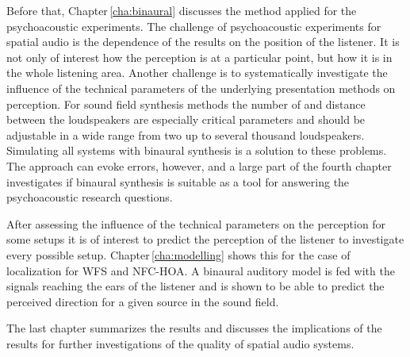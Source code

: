 Before that, Chapter\,\ref{cha:binaural} discusses the method applied for the
psychoacoustic experiments.
The challenge of psychoacoustic experiments for spatial audio is
the dependence of the results on the position of the listener. It is not only of
interest how the perception is at a particular point, but how it is
in the whole listening area. Another challenge is to systematically investigate
the influence of the technical parameters of the underlying presentation
methods on perception. For sound field synthesis methods the number of and distance
between the loudspeakers are especially critical parameters and should be adjustable in a
wide range from two up to several thousand loudspeakers.
Simulating all systems with binaural synthesis is a solution to these problems.
The approach can evoke errors, however,  and a large part of the fourth chapter
investigates if binaural synthesis is suitable as a tool for answering the psychoacoustic
research questions.

After assessing the influence of the technical parameters on the perception for some
setups it is of interest to predict the perception of the listener to
investigate every possible setup. Chapter\,\ref{cha:modelling} shows this
for the case of localization for \ac{WFS} and
\ac{NFC-HOA}. A binaural auditory model is fed with the signals reaching the
ears of the listener
and is shown to be able to predict the perceived direction for a
given source in the sound field.

The last chapter summarizes the results and discusses the
implications of the results for further investigations of the quality of spatial
audio systems.



